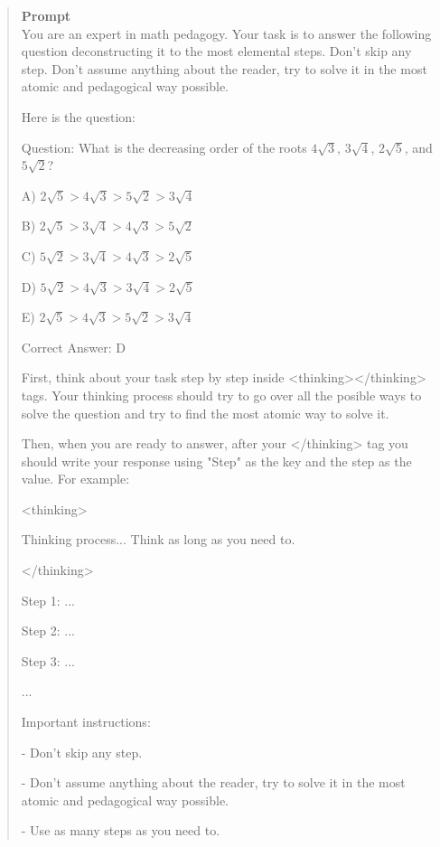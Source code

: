 \documentclass[11pt]{article}
\begin{document}
\begin{quote} %
    \textbf{Prompt} \\
    You are an expert in math pedagogy. Your task is to answer the following question deconstructing it to the most elemental steps. Don't skip any step. Don't assume anything about the reader, try to solve it in the most atomic and pedagogical way possible.

    \vspace{1em}

    Here is the question:
    \vspace{1em}

    Question: What is the decreasing order of the roots $4\sqrt{3}$, $3\sqrt{4}$, $2\sqrt{5}$, and $5\sqrt{2}$?

    A) $2\sqrt5 > 4\sqrt3 > 5\sqrt2 > 3\sqrt4$

    B) $2\sqrt5 > 3\sqrt4 > 4\sqrt3 > 5\sqrt2$

    C) $5\sqrt2 > 3\sqrt4 > 4\sqrt3 > 2\sqrt5$

    D) $5\sqrt2 > 4\sqrt3 > 3\sqrt4 > 2\sqrt5$

    E) $2\sqrt5 > 4\sqrt3 > 5\sqrt2 > 3\sqrt4$

    Correct Answer: D

    \vspace{1em}

    First, think about your task step by step inside <thinking></thinking> tags. Your thinking process should try to go over all the posible ways to solve the question and try to find the most atomic way to solve it.

    \vspace{1em}

    Then, when you are ready to answer, after your </thinking> tag you should write your response using "Step" as the key and the step as the value. For example:

    \vspace{1em}

    <thinking>

      Thinking process... Think as long as you need to.

    </thinking>

    \vspace{1em}

    Step 1: ...

    Step 2: ...

    Step 3: ...

    ...

    \vspace{1em}

    Important instructions:

    - Don't skip any step.

    - Don't assume anything about the reader, try to solve it in the most atomic and pedagogical way possible.

    - Use as many steps as you need to.
\end{quote}
\end{document}
